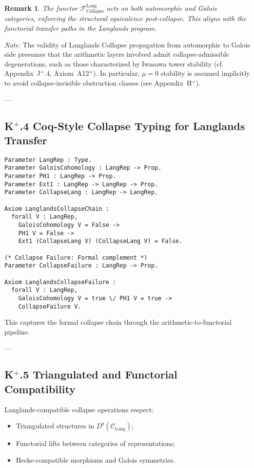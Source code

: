 \documentclass[11pt]{article}
\newtheorem{remark}[theorem]{Remark}
\begin{document}
\begin{remark}
The functor \( \mathcal{F}_{\mathrm{Collapse}}^{\mathrm{Lang}} \) acts on both automorphic and Galois categories,  
enforcing the structural equivalence post-collapse. This aligns with the functorial transfer paths in the Langlands program.
\end{remark}

\textit{Note.} The validity of Langlands Collapse propagation from automorphic to Galois side presumes that the arithmetic layers involved admit collapse-admissible degenerations, such as those characterized by Iwasawa tower stability (cf. Appendix~J$^{+}$.4, Axiom~A12$^{+}$). In particular, \( \mu = 0 \) stability is assumed implicitly to avoid collapse-invisible obstruction classes (see Appendix~H$^{+}$).


---

\subsection*{K$^{+}$.4 Coq-Style Collapse Typing for Langlands Transfer}

\begin{lstlisting}[language=Coq, mathescape=false]
Parameter LangRep : Type.
Parameter GaloisCohomology : LangRep -> Prop.
Parameter PH1 : LangRep -> Prop.
Parameter Ext1 : LangRep -> LangRep -> Prop.
Parameter CollapseLang : LangRep -> LangRep.

Axiom LanglandsCollapseChain :
  forall V : LangRep,
    GaloisCohomology V = False ->
    PH1 V = False ->
    Ext1 (CollapseLang V) (CollapseLang V) = False.

(* Collapse Failure: Formal complement *)
Parameter CollapseFailure : LangRep -> Prop.

Axiom LanglandsCollapseFailure :
  forall V : LangRep,
    GaloisCohomology V = true \/ PH1 V = true ->
    CollapseFailure V.
\end{lstlisting}

This captures the formal collapse chain through the arithmetic-to-functorial pipeline.

---

\subsection*{K$^{+}$.5 Triangulated and Functorial Compatibility}

Langlands-compatible collapse operations respect:

\begin{itemize}
    \item Triangulated structures in \( D^b(\mathcal{C}_{\mathrm{Lang}}) \);
    \item Functorial lifts between categories of representations;
    \item Hecke-compatible morphisms and Galois symmetries.
\end{itemize}
\end{document}
